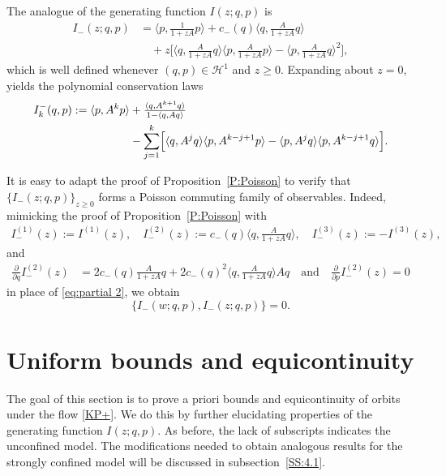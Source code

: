 \documentclass{amsart}
\newcommand{\qtq}[1]{\quad\text{#1}\quad}
\theoremstyle{definition}
\numberwithin{equation}{section}
\renewcommand{\H}{\mathcal H}
\newcommand{\ra}{\rangle}
\begin{document}
The analogue of the generating function $I(z;q,p)$ is
\begin{equation}\label{eq:definition_Iz_minus}
\begin{aligned}
I_-(z;q,p)&=\langle p,\tfrac{1}{1+zA}p\rangle+c_-(q)\langle q,\tfrac{A}{1+zA}q\rangle\\
&\quad +z\bigl[\langle q,\tfrac{A}{1+ zA}q\rangle\langle p,\tfrac{A}{1+ zA}p\rangle-\langle p,\tfrac{A}{1+ zA}q\rangle^2\bigr],
\end{aligned}
\end{equation}
which is well defined whenever $(q,p)\in \H^1$ and $z\geq 0$. Expanding about $z=0$, yields the polynomial conservation laws
\begin{align*}
I_k^-(q,p) :=  \langle p, A^{k} p\rangle &+ \tfrac{\langle q, A^{k+1} q\rangle}{1 - \langle q, A q\rangle}\\
&- \sum_{j=1}^{k} \Bigl[ \langle q, A^{j} q\rangle \langle p, A^{k-j+1} p\rangle - \langle p, A^{j} q\rangle \langle p, A^{k-j+1} q\rangle \Bigr].
\end{align*}

It is easy to adapt the proof of Proposition~\ref{P:Poisson} to verify that $\{I_-(z;q, p)\}_{z\geq 0}$ forms a Poisson commuting family of observables.  Indeed, mimicking the proof of Proposition~\ref{P:Poisson} with
\begin{align*}
I_-^{(1)}(z):= I^{(1)}(z), \quad I_-^{(2)}(z):= c_-(q)\langle q,\tfrac{A}{1+zA}q\ra, \quad I_-^{(3)}(z):=- I^{(3)}(z),
\end{align*}
and 
\begin{align*}
\tfrac{\partial}{\partial q} I_-^{(2)} (z)&= 2 c_-(q)  \tfrac{A}{1+zA}q + 2 c_-(q)^2\langle q, \tfrac{A}{1+zA}q\rangle Aq  \qtq{and} \tfrac{\partial}{\partial p} I_-^{(2)}(z) = 0
\end{align*}
in place of \eqref{eq:partial 2}, we obtain
\begin{equation*}
\{I_-(w;q,p),I_-(z;q,p)\}=0.
\end{equation*}



\section{Uniform bounds and equicontinuity}\label{S:4}

The goal of this section is to prove a priori bounds and equicontinuity of orbits under the flow \eqref{KP+}. We do this by further elucidating properties of the generating function $I(z;q,p)$.  As before, the lack of subscripts indicates the unconfined model. The modifications needed to obtain analogous results for the strongly confined model will be discussed in subsection~\ref{SS:4.1}.
\end{document}
